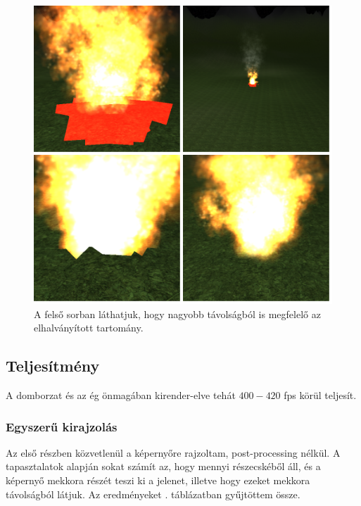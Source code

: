 \begin{figure}[h]
 \centering
 \includegraphics[width=\textwidth]{kepek/softParticle.png}
 \caption{A felső sorban láthatjuk, hogy nagyobb távolságból is megfelelő az elhalványított tartomány.}
 \label{fig:softParticle}
\end{figure}


\subsection{Teljesítmény}
A domborzat és az ég önmagában kirender-elve tehát $400-420$ fps körül teljesít.

\subsubsection{Egyszerű kirajzolás}
Az első részben közvetlenül a képernyőre rajzoltam, post-processing nélkül. A tapasztalatok alapján sokat számít az, hogy mennyi részecskéből áll, és a képernyő mekkora részét teszi ki a jelenet, illetve hogy ezeket mekkora távolságból látjuk. Az eredményeket . táblázatban gyűjtöttem össze.

